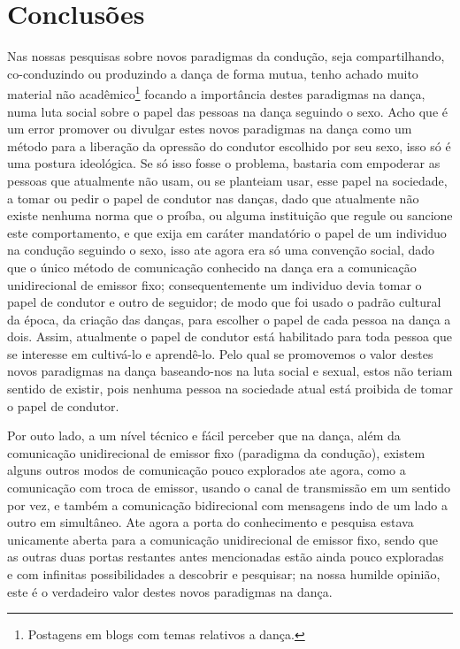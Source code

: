 \documentclass[a4paper,10pt]{article}
\begin{document}
\section{Conclusões}
Nas nossas pesquisas sobre novos paradigmas da condução, seja compartilhando, 
co-conduzindo ou produzindo a dança de forma mutua, 
tenho achado muito material não 
acadêmico\footnote{Postagens em blogs com temas relativos a dança.} 
focando a importância destes paradigmas na dança, 
numa luta social sobre o papel das pessoas na dança seguindo o sexo.
Acho que é um error promover ou divulgar estes novos paradigmas na dança 
como um método para a liberação da opressão do condutor escolhido por seu sexo, 
isso só é uma postura ideológica. 
Se só isso fosse o problema, 
bastaria com empoderar as pessoas que atualmente não usam, 
ou se planteiam usar, esse papel na sociedade, 
a tomar ou pedir o papel de condutor nas danças, 
dado que atualmente não existe nenhuma norma que o proíba,
ou alguma instituição que regule ou sancione este comportamento,
e que exija em caráter mandatório o papel de um individuo na condução seguindo o sexo,
isso ate agora era só uma convenção social, 
dado que o único método de comunicação conhecido na dança era a comunicação unidirecional de emissor fixo;
consequentemente um individuo devia tomar o papel de condutor e outro de seguidor;
de modo que foi usado o padrão cultural da época, da criação das danças, 
para escolher o papel de cada pessoa na dança a dois. 
Assim,  atualmente o papel de condutor está habilitado para toda pessoa que se interesse em 
cultivá-lo e aprendê-lo. 
Pelo qual se promovemos o valor destes novos paradigmas na dança baseando-nos na luta social e sexual, 
estos não teriam sentido de existir, 
pois nenhuma pessoa na sociedade atual está proibida de tomar o papel de condutor.

Por outo lado, a um nível técnico e fácil perceber que na dança, além da comunicação 
unidirecional de emissor fixo  (paradigma da condução),
existem alguns outros modos de comunicação pouco explorados ate agora,
como a comunicação com troca de emissor, 
usando o canal de transmissão em um sentido por vez,
e também a comunicação bidirecional com mensagens indo de um lado a outro em simultâneo.
Ate agora a porta do conhecimento e pesquisa estava unicamente aberta para a 
comunicação unidirecional de emissor fixo, 
sendo que as outras duas portas restantes antes mencionadas estão ainda pouco 
exploradas e com infinitas possibilidades a descobrir e pesquisar; 
na nossa humilde opinião, este é o verdadeiro valor destes novos paradigmas na dança. 


\medskip
 
\printbibliography
\end{document}
